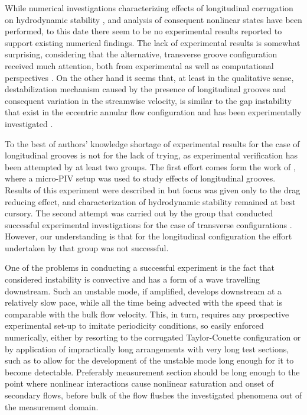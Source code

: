 \documentclass[lineno]{jfm}
\begin{document}
While numerical investigations characterizing effects of longitudinal corrugation on hydrodynamic stability \citep{Szumbar2007, Szumbar2011, Mohammadi2015}, and analysis of consequent nonlinear states \citep{Nikesh2017,Pushenko2021} have been performed, to this date there seem to be no experimental results reported to support existing numerical findings.
The lack of experimental results is somewhat surprising, considering that the alternative, transverse groove configuration received much attention, both from experimental as well as computational perspectives \citep[][]{Sobey1980a,Nishimura1984,Nishimura1985,Nishimura1990b,Nishimura1990a,Gschwind1995,mitsudharmadi2012,Blancher1998,Floryan2010,Cabal2002, Rivera2013,gepner2016}.
On the other hand it seems that, at least in the qualitative sense, destabilization mechanism caused by the presence of longitudinal grooves and consequent variation in the streamwise velocity, is similar to the gap instability \citep{Gagnon_Tavoularis_2021, moradi2019flow} that exist in the eccentric annular flow configuration and has been experimentally investigated \citep{Piot2011}.

To the best of authors' knowledge shortage of experimental results for the case of longitudinal grooves is not for the lack of trying,
as experimental verification has been attempted by at least two groups.
The first effort comes form the work of \citet[][a PhD thesis in Polish]{Blonski2007},
where a micro-PIV setup was used to study effects of longitudinal grooves.
Results of this experiment were described in
\citep{szumbarski2011impact} but focus was given only to the drag reducing effect,
and characterization of hydrodynamic stability remained at best cursory.
The second attempt was carried out by the group that conducted successful experimental investigations for the case of transverse configurations \citep{Asai2006,Floryan2011}.
However, our understanding is that for the longitudinal configuration the effort undertaken by that group was not successful.%

One of the problems in conducting a successful experiment is the fact that considered instability is convective and has a form of a wave travelling downstream.
Such an unstable mode, if amplified, develops downstream at a relatively slow pace,
while all the time being advected with the speed that is comparable with the bulk flow velocity.
This, in turn, requires any prospective experimental set-up to imitate periodicity conditions, so easily enforced numerically,
either by resorting to the corrugated Taylor-Couette configuration \citep[see][for numerical analysis of such configuration]{Ng2018}
or by application of impractically long arrangements with very long test sections,
such as to allow for the development of the unstable mode long enough for it to become detectable.
Preferably measurement section should be long enough to the point where nonlinear interactions cause nonlinear saturation and onset of secondary flows, before bulk of the flow flushes the investigated phenomena out of the measurement domain.
\end{document}
